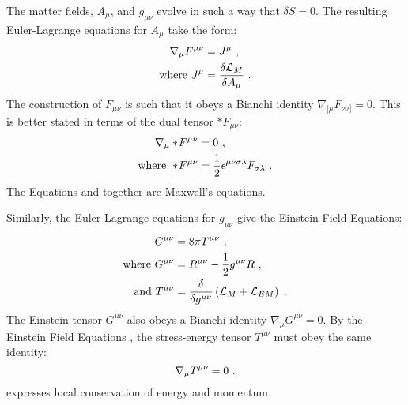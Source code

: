   The matter fields, $A_\mu$, and $g_{\mu\nu}$ evolve in such a way that $\delta S = 0$.  The resulting Euler-Lagrange equations for $A_\mu$ take the form:
  \begin{align}
  	\nabla_\mu F^{\mu\nu} &= J^\mu \eqlabel{maxwell1} \ , \\
	\text{where } J^\mu &= \frac{\delta \LL_M}{\delta A_\mu}\ .
   \end{align}
   The construction of $F_{\mu\nu}$ is such that it obeys a Bianchi identity $\nabla_{[\mu}F_{\nu\sigma]} = 0$.  This is better stated in terms of the dual tensor $*F_{\mu\nu}$:
     \begin{align}
  	\nabla_\mu *\! F^{\mu\nu} &= 0 \eqlabel{maxwell2} \ , \\
	\text{where } *\! F^{\mu\nu} &= \frac{1}{2}\epsilon^{\mu\nu\sigma\lambda}F_{\sigma\lambda} \ .
   \end{align}
   The Equations  and  together are Maxwell's equations.
   
   Similarly, the Euler-Lagrange equations for $g_{\mu\nu}$ give the Einstein Field Equations:
  \begin{align}
	G^{\mu\nu} &= 8\pi T^{\mu\nu} \eqlabel{einstein} \ , \\
	\text{where } G^{\mu\nu} &= R^{\mu\nu} - \frac{1}{2}g^{\mu\nu} R \ , \\
	\text{and } T^{\mu\nu} &= \frac{\delta}{\delta g^{\mu\nu}}\left( \LL_M + \LL_{EM} \right) \ .
   \end{align} 
   The Einstein tensor $G^{\mu\nu}$ also obeys a Bianchi identity $\nabla_\mu G^{\mu\nu}=0$. By the Einstein Field Equations , the stress-energy tensor $T^{\mu\nu}$ must obey the same identity:
   \begin{equation}
   	\nabla_\mu T^{\mu\nu} = 0 \eqlabel{consSE}\ .
   \end{equation}  
    expresses local conservation of energy and momentum.
   
